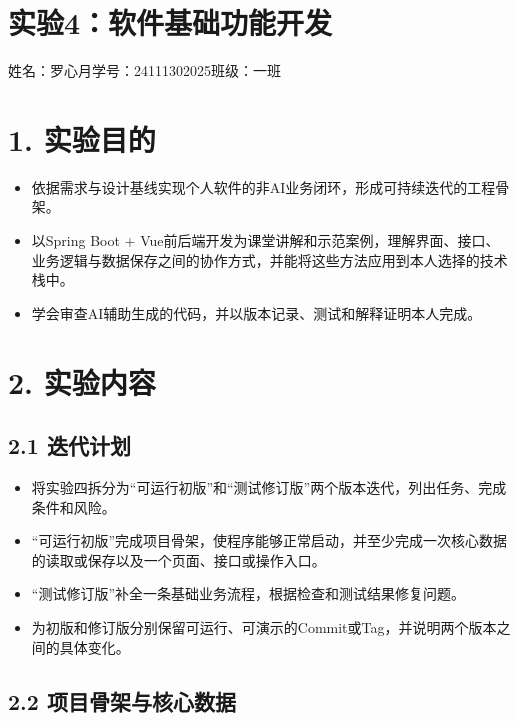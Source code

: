 \documentclass[UTF8,12pt,a4paper]{ctexart}
\begin{document}
\section*{实验4：软件基础功能开发}

\begin{center}
姓名：罗心月\qquad 学号：24111302025\qquad 班级：一班
\end{center}

\section*{1. 实验目的}

\begin{itemize}
  \item 依据需求与设计基线实现个人软件的非AI业务闭环，形成可持续迭代的工程骨架。
  \item 以Spring Boot + Vue前后端开发为课堂讲解和示范案例，理解界面、接口、业务逻辑与数据保存之间的协作方式，并能将这些方法应用到本人选择的技术栈中。
  \item 学会审查AI辅助生成的代码，并以版本记录、测试和解释证明本人完成。
\end{itemize}

\section*{2. 实验内容}

\subsection*{2.1 迭代计划}

\begin{itemize}
  \item 将实验四拆分为“可运行初版”和“测试修订版”两个版本迭代，列出任务、完成条件和风险。
  \item “可运行初版”完成项目骨架，使程序能够正常启动，并至少完成一次核心数据的读取或保存以及一个页面、接口或操作入口。
  \item “测试修订版”补全一条基础业务流程，根据检查和测试结果修复问题。
  \item 为初版和修订版分别保留可运行、可演示的Commit或Tag，并说明两个版本之间的具体变化。
\end{itemize}

\subsection*{2.2 项目骨架与核心数据}
\end{document}

